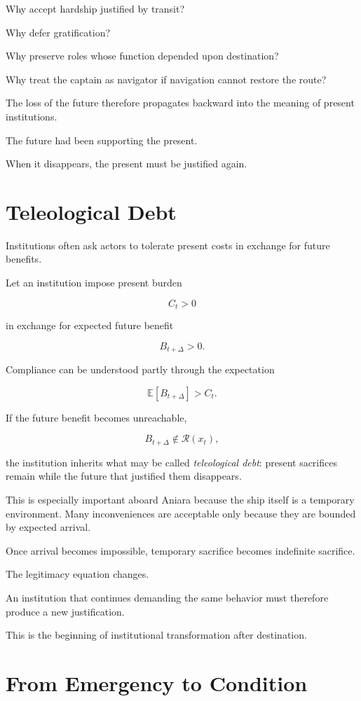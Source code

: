 \documentclass[11pt,oneside]{book}
\theoremstyle{definition}
\theoremstyle{remark}
\newcommand{\R}{\mathcal{R}}
\begin{document}
Why accept hardship justified by transit?

Why defer gratification?

Why preserve roles whose function depended upon destination?

Why treat the captain as navigator if navigation cannot restore the route?

The loss of the future therefore propagates backward into the meaning of present institutions.

The future had been supporting the present.

When it disappears, the present must be justified again.

\section{Teleological Debt}

Institutions often ask actors to tolerate present costs in exchange for future benefits.

Let an institution impose present burden

\[
C_t>0
\]

in exchange for expected future benefit

\[
B_{t+\Delta}>0.
\]

Compliance can be understood partly through the expectation

\[
\mathbb E[B_{t+\Delta}]
>
C_t.
\]

If the future benefit becomes unreachable,

\[
B_{t+\Delta}\notin\R(x_t),
\]

the institution inherits what may be called \emph{teleological debt}: present sacrifices remain while the future that justified them disappears.

This is especially important aboard Aniara because the ship itself is a temporary environment. Many inconveniences are acceptable only because they are bounded by expected arrival.

Once arrival becomes impossible, temporary sacrifice becomes indefinite sacrifice.

The legitimacy equation changes.

An institution that continues demanding the same behavior must therefore produce a new justification.

This is the beginning of institutional transformation after destination.

\section{From Emergency to Condition}
\end{document}
